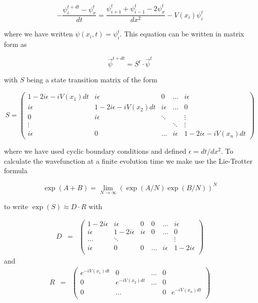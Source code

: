 \begin{equation}
-\frac{\psi_i^{t+dt}-\psi_x^{t}}{dt} = \frac{\psi_{i+1}^t+\psi_{i-1}^t-2\psi_x^t}{dx^2} -V(x_i)\psi_i^t
\end{equation}

where we have written $\psi(x_i,t)=\psi_i^t$. This equation can be written in matrix form as

\begin{equation}
\vec{\psi}^{t+dt} = S^t  \cdot \vec{\psi}^t
\end{equation}

with $S$ being a state transition matrix of the form

\begin{equation}
S = \left(
	\begin{array}{ccccc}
		1-2i\epsilon-iV(x_1)dt & i\epsilon & 0 & \hdots &  i\epsilon \\
		i \epsilon & 1-2i\epsilon -iV(x_2)dt & i\epsilon & \hdots & 0 \\
		0 & i\epsilon & \ddots & & \vdots \\
		\vdots & & & \ddots  & \vdots \\
		i \epsilon & 0 & \hdots & i\epsilon & 1 - 2i\epsilon -iV(x_n)dt
	\end{array}
 \right) \label{eq:grover_iteration_matrix}
\end{equation}

where we have used cyclic boundary conditions and defined $\epsilon = dt/dx^2$. To calculate the wavefunction at a finite evolution time we make use the Lie-Trotter formula

\begin{equation}
\exp{\left(A+B\right)} = \lim\limits_{N\to\infty}\left(\exp{\left(A/N\right)}\exp{\left(B/N\right)}\right)^N
\end{equation}

to write $\exp{\left(S\right)} \approx D\cdot R$ with 

\begin{eqnarray}
D & = & \left( 
		\begin{array}{cccccc}
		1-2i \epsilon & i\epsilon & 0 & 0 & \hdots & i\epsilon \\
		i \epsilon & 1 - 2i \epsilon & i \epsilon & 0 & \hdots & 0 \\
		\hdots & \ddots & & & & \vdots \\
		i \epsilon & 0 & 0 &  \hdots & i\epsilon & 1-2i \epsilon \\
		\end{array}
	\right)
\end{eqnarray}
and 
\begin{eqnarray}
R & = & \left( \begin{array}{ccccc}
	e^{-i V(x_1) dt} & 0 & \hdots & 0 \\
	0 & e^{-i V (x_2) dt} & \hdots & 0 \\
	0 & \hdots & & 0 & e^{-i V (x_n) dt} \\
	\end{array}
	\right)
\end{eqnarray}

